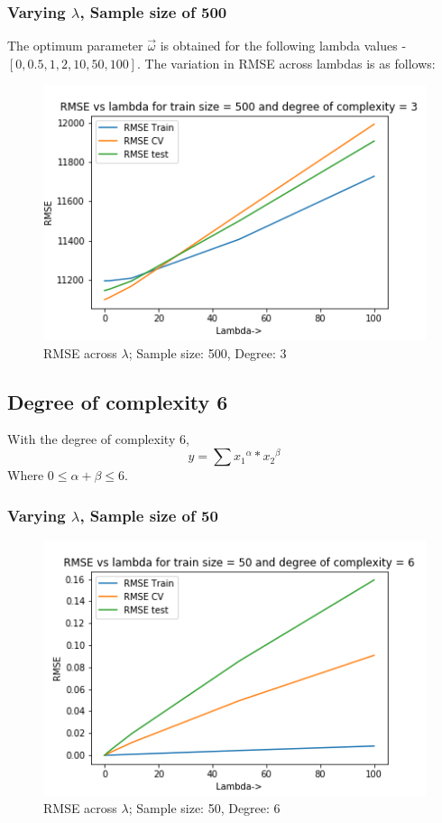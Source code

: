 \documentclass[12pt,a4paper]{article}
\begin{document}
\subsubsection{Varying $\lambda$, Sample size of 500}
 
The optimum parameter \textbf{$\vec{\omega}$} is obtained for the following lambda values - $[0, 0.5, 1, 2, 10, 50, 100]$.  The variation in RMSE across lambdas is as follows: \\
 
\begin{figure}[H]
     \centering
     \includegraphics[scale=0.7]{images/d3_500.png}
     \caption{RMSE across $\lambda$; Sample size: 500, Degree: 3}
     \label{fig:d3500}
\end{figure}
 
\subsection{Degree of complexity 6}

With the degree of complexity 6, 
\begin{equation}
    y=\sum {x_1}^\alpha*{x_2}^\beta
\end{equation}
Where $0\leq\alpha+\beta\leq6$.
\subsubsection{Varying $\lambda$, Sample size of 50}


\begin{figure}[H]
     \centering
     \includegraphics[scale=0.7]{images/d6_50.png}
     \caption{RMSE across $\lambda$; Sample size: 50, Degree: 6}
     \label{fig:d650}
\end{figure}
 
\end{document}
